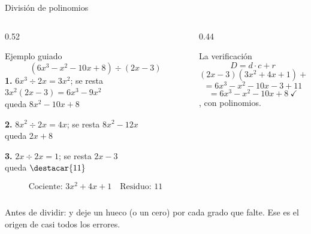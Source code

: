 \documentclass[aspectratio=169,10pt]{beamer}
\begin{document}
\begin{frame}{División de polinomios}
  \scriptsize
  \begin{columns}[T,onlytextwidth]
    \begin{column}{0.52\textwidth}
      \begin{exampleblock}{Ejemplo guiado}
        \tiny
        \[ \left(6x^{3}-x^{2}-10x+8\right) \div (2x-3) \]
        \textbf{1.} $6x^{3}\div 2x = 3x^{2}$; se resta
        $3x^{2}(2x-3)=6x^{3}-9x^{2}$ \\
        \hspace*{0.3cm} queda $8x^{2}-10x+8$

        \textbf{2.} $8x^{2}\div 2x = 4x$; se resta $8x^{2}-12x$ \\
        \hspace*{0.3cm} queda $2x+8$

        \textbf{3.} $2x\div 2x = 1$; se resta $2x-3$ \\
        \hspace*{0.3cm} queda $\destacar{11}$

        \[ \text{Cociente: } 3x^{2}+4x+1 \quad
           \text{Residuo: } 11 \]
      \end{exampleblock}
    \end{column}
    \begin{column}{0.44\textwidth}
      \begin{alertblock}{La verificación}
        \tiny
        \[ D = d\cdot c + r \]
        \[ (2x-3)(3x^{2}+4x+1) + 11 \]
        \[ = 6x^{3}-x^{2}-10x-3+11 \]
        \[ = 6x^{3}-x^{2}-10x+8 \ \checkmark \]
        , con
        polinomios.
      \end{alertblock}
    \end{column}
  \end{columns}

  \vspace{0.05cm}
  {\tiny\color{uniGris} Antes de dividir:  y deje un hueco (o un cero) por cada grado que falte.
  Ese es el origen de casi todos los errores.}
\end{frame}

\end{document}
